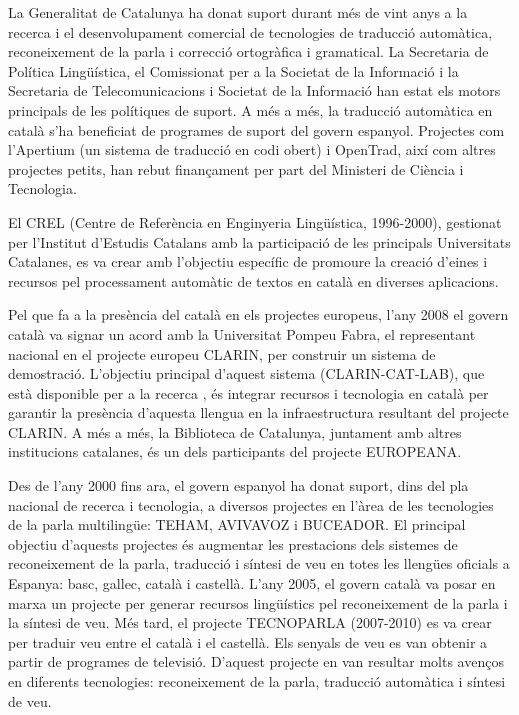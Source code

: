 \begin{multicols}{2}
La Generalitat de Catalunya ha donat suport durant més de vint anys a la recerca i el desenvolupament comercial de tecnologies de traducció automàtica, reconeixement de la parla i correcció ortogràfica i gramatical. La Secretaria de Política Lingüística, el Comissionat per a la Societat de la Informació i la Secretaria de Telecomunicacions i Societat de la Informació han estat els motors principals de les polítiques de suport. A més a més, la traducció automàtica en català s’ha beneficiat de programes de suport del govern espanyol. Projectes com l’Apertium (un sistema de traducció en codi obert) i OpenTrad, així com altres projectes petits, han rebut finançament per part del Ministeri de Ciència i Tecnologia. 


El CREL (Centre de Referència en Enginyeria Lingüística, 1996-2000), gestionat per l’Institut d’Estudis Catalans amb la participació de les principals Universitats Catalanes, es va crear amb l’objectiu específic de promoure la creació d’eines i recursos pel processament automàtic de textos en català en diverses aplicacions. 
\columnbreak

Pel que fa a la presència del català en els projectes europeus, l’any 2008 el govern català va signar un acord amb la Universitat Pompeu Fabra, el representant nacional en el projecte europeu CLARIN, per construir un sistema de demostració. L’objectiu principal d’aquest sistema (CLARIN-CAT-LAB), que està disponible per a la recerca \cite{CAT-Nota30}, és integrar recursos i tecnologia en català per garantir la presència d’aquesta llengua en la infraestructura resultant del projecte CLARIN. A més a més, la Biblioteca de Catalunya, juntament amb altres institucions catalanes, és un dels participants del projecte EUROPEANA. 

Des de l’any 2000 fins ara, el govern espanyol ha donat suport, dins del pla nacional de recerca i tecnologia, a diversos projectes en l’àrea de les tecnologies de la parla multilingüe: TEHAM, AVIVAVOZ i BUCEADOR. El principal objectiu d’aquests projectes és augmentar les prestacions dels sistemes de reconeixement de la parla, traducció i síntesi de veu en totes les llengües oficials a Espanya: basc, gallec, català i castellà. L’any 2005, el govern català va posar en marxa un projecte per generar recursos lingüístics pel reconeixement de la parla i la síntesi de veu. Més tard, el projecte TECNOPARLA (2007-2010) es va crear per traduir veu entre el català i el castellà. Els senyals de veu es van obtenir a partir de programes de televisió. D’aquest projecte en van resultar molts avenços en diferents tecnologies: reconeixement de la parla, traducció automàtica i síntesi de veu.


\end{multicols}
